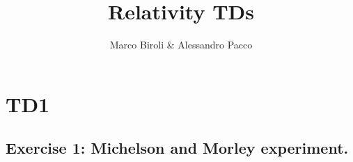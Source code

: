 \documentclass[10pt,a4paper]{book}
\author{Marco Biroli \& Alessandro Pacco}
\title{Relativity TDs}
\begin{document}
\maketitle

\chapter{TD1}
\section{Exercise 1: Michelson and Morley experiment.}
\end{document}
